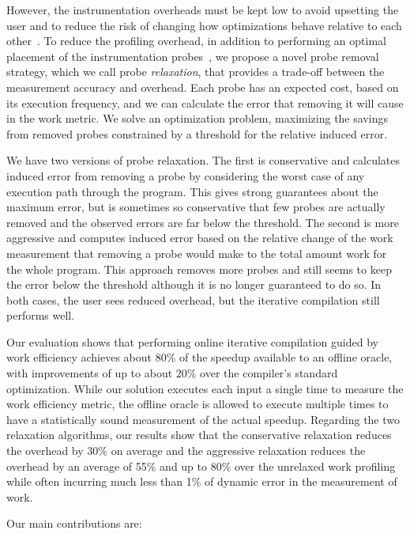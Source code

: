     However, the instrumentation overheads must be kept low to avoid upsetting the user and to reduce the risk of changing how
    optimizations behave relative to each other~\cite{forman81,anderson97,duesterwald00}. To reduce the profiling overhead, in addition to
    performing an optimal placement of the instrumentation probes~\cite{knuth73,forman81,ball94}, we propose a novel probe removal
    strategy, which we call probe \textit{relaxation}, that provides a trade-off between the measurement accuracy and overhead. Each probe
    has an expected cost, based on its execution frequency, and we can calculate the error that removing it will cause in the work metric.
    We solve an optimization problem, maximizing the savings from removed probes constrained by a threshold for the relative induced error.

    We have two versions of probe relaxation. The first is conservative and calculates induced error from removing a probe by considering
    the worst case of any execution path through the program. This gives strong guarantees about the maximum error, but is sometimes so
    conservative that few probes are actually removed and the observed errors are far below the threshold. The second is more aggressive
    and computes induced error based on the relative change of the work measurement that removing a probe would make to the total amount
    work for the whole program. This approach removes more probes and still seems to keep the error below the threshold although it is no
    longer guaranteed to do so. In both cases, the user sees reduced overhead, but the iterative compilation still performs well.

    Our evaluation shows that performing online iterative compilation guided by work efficiency achieves about 80\% of the speedup
    available to an offline oracle, with improvements of up to about 20\% over the compiler's standard optimization. While our solution
    executes each input a single time to measure the work efficiency metric, the offline oracle is allowed to execute multiple times to
    have a statistically sound measurement of the actual speedup. Regarding the two relaxation algorithms, our results show that the
    conservative relaxation reduces the overhead by 30\% on average and the aggressive relaxation reduces the overhead by an average of
    55\% and up to 80\% over the unrelaxed work profiling while often incurring much less than 1\% of dynamic error in the measurement of
    work.

    Our main contributions are:

